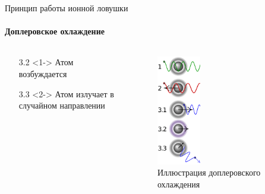\documentclass{beamer}
\begin{document}
    \begin{frame}{Принцип работы ионной ловушки}
    \framesubtitle{Доплеровское охлаждение}
        \begin{columns}

        \begin{column}{0.5\textwidth}

            \begin{itemize}
                \item[3.2] <1-> Атом возбуждается
                \item[3.3] <2-> Атом излучает в случайном направлении
            \end{itemize}

        \end{column}

        \begin{column}{0.5\textwidth}
            \begin{figure}
                \centering
                \includegraphics[width=0.35\textwidth]{media/dopler-cooling.png}
                \caption{Иллюстрация доплеровского охлаждения}
            \end{figure}
        \end{column}

        \end{columns}

    \end{frame}
\end{document}
